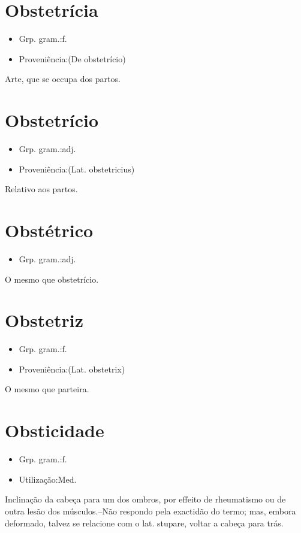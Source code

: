 \section{Obstetrícia}
\begin{itemize}
\item {Grp. gram.:f.}
\end{itemize}
\begin{itemize}
\item {Proveniência:(De \textunderscore obstetrício\textunderscore )}
\end{itemize}
Arte, que se occupa dos partos.
\section{Obstetrício}
\begin{itemize}
\item {Grp. gram.:adj.}
\end{itemize}
\begin{itemize}
\item {Proveniência:(Lat. \textunderscore obstetricius\textunderscore )}
\end{itemize}
Relativo aos partos.
\section{Obstétrico}
\begin{itemize}
\item {Grp. gram.:adj.}
\end{itemize}
O mesmo que \textunderscore obstetrício\textunderscore .
\section{Obstetriz}
\begin{itemize}
\item {Grp. gram.:f.}
\end{itemize}
\begin{itemize}
\item {Proveniência:(Lat. \textunderscore obstetrix\textunderscore )}
\end{itemize}
O mesmo que \textunderscore parteira\textunderscore .
\section{Obsticidade}
\begin{itemize}
\item {Grp. gram.:f.}
\end{itemize}
\begin{itemize}
\item {Utilização:Med.}
\end{itemize}
Inclinação da cabeça para um dos ombros, por effeito de rheumatismo ou de outra lesão dos músculos.--Não respondo pela exactidão do termo; mas, embora deformado, talvez se relacione com o lat. \textunderscore stupare\textunderscore , voltar a cabeça para trás.
